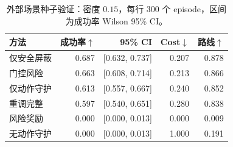 \begin{table}[t]
\centering
\caption{外部场景种子验证：密度 $0.15$，每行 300 个 episode，区间为成功率 Wilson 95\% CI。}
\label{tab:external-d015}
\small
\begin{tabular}{lrrrr}
\toprule
方法 & 成功率$\uparrow$ & 95\% CI & Cost$\downarrow$ & 路线$\uparrow$ \\
\midrule
仅安全屏蔽 & 0.687 & [0.632, 0.737] & 0.207 & 0.878 \\
门控风险 & 0.663 & [0.608, 0.714] & 0.213 & 0.866 \\
仅动作守护 & 0.613 & [0.557, 0.667] & 0.240 & 0.852 \\
重调完整 & 0.597 & [0.540, 0.651] & 0.280 & 0.838 \\
风险奖励 & 0.000 & [0.000, 0.013] & 0.000 & 0.009 \\
无动作守护 & 0.000 & [0.000, 0.013] & 1.000 & 0.191 \\
\bottomrule
\end{tabular}
\end{table}
